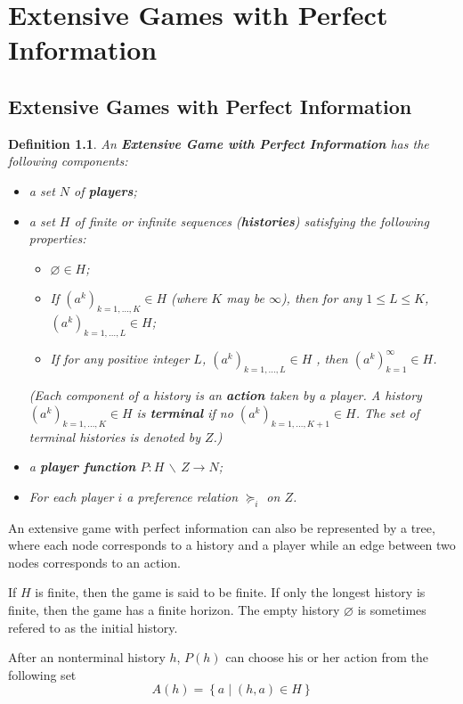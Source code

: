 \documentclass[openany]{book}
\newtheorem{definition}{Definition}[chapter]
\begin{document}
\chapter{Extensive Games with Perfect Information}
\section{Extensive Games with Perfect Information}
\begin{definition}
An \textbf{Extensive Game with Perfect Information} has the following components:
\begin{itemize}
\item a set $N$ of \textbf{players};
\item a set $H$ of finite or infinite sequences (\textbf{histories}) satisfying the following properties:
\begin{itemize}
\item $\varnothing\in H$;
\item If $(a^k)_{k=1,\ldots,K}\in H$ (where $K$ may be $\infty$), then for any $1\le L\le K$, $(a^k)_{k=1,\ldots,L}\in H$;
\item If for any positive integer $L$, $(a^k)_{k=1,\ldots,L}\in H$ , then $(a^k)_{k=1}^{\infty}\in H$.
\end{itemize}
(Each component of a history is an \textbf{action} taken by a player. A history $(a^k)_{k=1,\ldots,K}\in H$ is \textbf{terminal} if no $(a^k)_{k=1,\ldots,K+1}\in H$. The set of terminal histories is denoted by $Z$.)
\item a \textbf{player function} $P:H\,\backslash\,Z\rightarrow N$;
\item For each player $i$ a preference relation $\succeq_i$ on $Z$.
\end{itemize}
\end{definition}

An extensive game with perfect information can also be represented by a tree, where each node corresponds to a history and a player while an edge between two nodes corresponds to an action.

If $H$ is finite, then the game is said to be finite. If only the longest history is finite, then the game has a finite horizon. The empty history $\varnothing$ is sometimes refered to as the initial history.

After an nonterminal history $h$, $P(h)$ can choose his or her action from the following set
\begin{equation}
A(h)=\left\{a\middle|(h,a)\in H\right\}
\end{equation}
\end{document}
